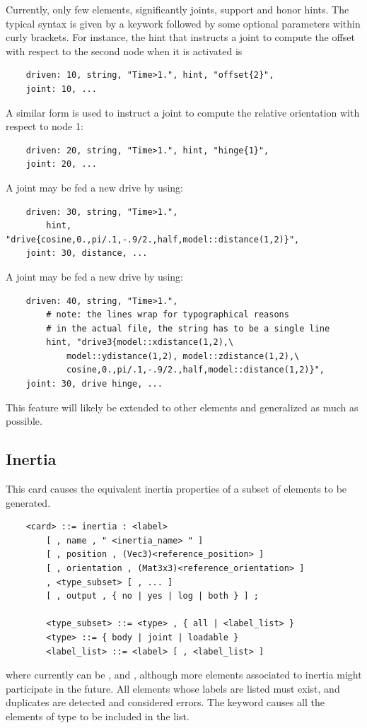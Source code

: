 Currently, only few elements, significantly joints, support 
and honor hints.
The typical syntax is given by a keywork followed by some optional
parameters within curly brackets.
For instance, the hint that instructs a joint to compute the offset
with respect to the second node when it is activated is
\begin{verbatim}
    driven: 10, string, "Time>1.", hint, "offset{2}",
    joint: 10, ...
\end{verbatim}
A similar form is used to instruct a joint to compute the relative
orientation with respect to node 1:
\begin{verbatim}
    driven: 20, string, "Time>1.", hint, "hinge{1}",
    joint: 20, ...
\end{verbatim}
A  joint may be fed a new drive by using:
\begin{verbatim}
    driven: 30, string, "Time>1.",
        hint, "drive{cosine,0.,pi/.1,-.9/2.,half,model::distance(1,2)}",
    joint: 30, distance, ... 
\end{verbatim}
A  joint may be fed a new drive by using:
\begin{verbatim}
    driven: 40, string, "Time>1.",
        # note: the lines wrap for typographical reasons
        # in the actual file, the string has to be a single line
        hint, "drive3{model::xdistance(1,2),\
            model::ydistance(1,2), model::zdistance(1,2),\
            cosine,0.,pi/.1,-.9/2.,half,model::distance(1,2)}",
    joint: 30, drive hinge, ... 
\end{verbatim}

This feature will likely be extended to other elements
and generalized as much as possible.


\subsection{Inertia}\label{sec:EL:MISC:INERTIA}
This card causes the equivalent inertia properties of a subset
of elements to be generated.
\begin{verbatim}
    <card> ::= inertia : <label>
        [ , name , " <inertia_name> " ]
        [ , position , (Vec3)<reference_position> ]
        [ , orientation , (Mat3x3)<reference_orientation> ]
        , <type_subset> [ , ... ]
        [ , output , { no | yes | log | both } ] ;

        <type_subset> ::= <type> , { all | <label_list> }
        <type> ::= { body | joint | loadable }
        <label_list> ::= <label> [ , <label_list> ]
\end{verbatim}
where \kw{type} currently can be \kw{body},  and , 
although more elements associated to inertia might participate in the future.
All elements whose labels are listed must exist, and duplicates
are detected and considered errors.
The keyword \kw{all} causes all the elements of type \kw{type} 
to be included in the list.

